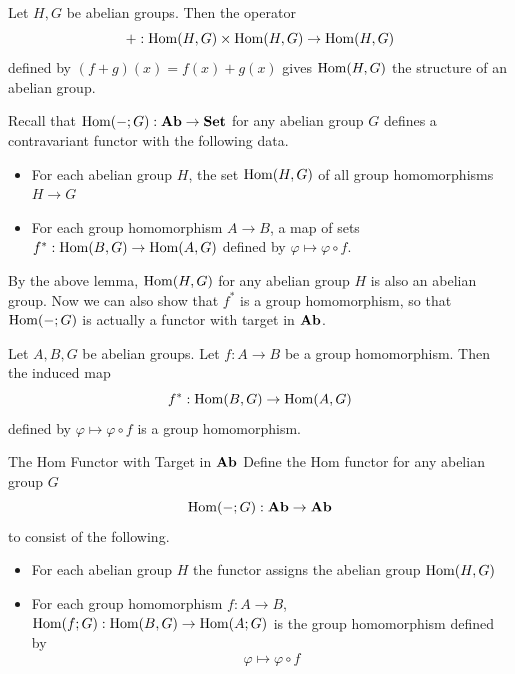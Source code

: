 \documentclass[a4paper]{article}
\begin{document}
\begin{lmm}{}{} Let $H,G$ be abelian groups. Then the operator $$+:\operatorname{Hom}(H,G)\times\operatorname{Hom}(H,G)\to\operatorname{Hom}(H,G)$$ defined by $(f+g)(x)=f(x)+g(x)$ gives $\operatorname{Hom}(H,G)$ the structure of an abelian group. 
\end{lmm}

Recall that $\operatorname{Hom}(-;G):\bold{Ab}\to\bold{Set}$ for any abelian group $G$ defines a contravariant functor with the following data. 
\begin{itemize}
\item For each abelian group $H$, the set $\operatorname{Hom}(H,G)$ of all group homomorphisms $H\to G$
\item For each group homomorphism $A\to B$, a map of sets $f^\ast:\operatorname{Hom}(B,G)\to\operatorname{Hom}(A,G)$ defined by $\varphi\mapsto\varphi\circ f$. 
\end{itemize}

By the above lemma, $\operatorname{Hom}(H,G)$ for any abelian group $H$ is also an abelian group. Now we can also show that $f^\ast$ is a group homomorphism, so that $\operatorname{Hom}(-;G)$ is actually a functor with target in $\bold{Ab}$. 

\begin{lmm}{}{} Let $A,B,G$ be abelian groups. Let $f:A\to B$ be a group homomorphism. Then the induced map $$f^\ast:\operatorname{Hom}(B,G)\to\operatorname{Hom}(A,G)$$ defined by $\varphi\mapsto\varphi\circ f$ is a group homomorphism. 
\end{lmm}

\begin{defn}{The Hom Functor with Target in $\bold{Ab}$}{} Define the Hom functor for any abelian group $G$ $$\operatorname{Hom}(-;G):\bold{Ab}\to\bold{Ab}$$ to consist of the following. 
\begin{itemize}
\item For each abelian group $H$ the functor assigns the abelian group $\operatorname{Hom}(H,G)$
\item For each group homomorphism $f:A\to B$, $\operatorname{Hom}(f;G):\operatorname{Hom}(B,G)\to\operatorname{Hom}(A;G)$ is the group homomorphism defined by $$\varphi\mapsto\varphi\circ f$$
\end{itemize}
\end{defn}
\end{document}

